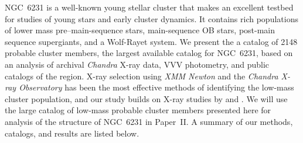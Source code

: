 \documentclass[twocolumn,tighten]{aastex61}
\begin{document}
NGC~6231 is a well-known young stellar cluster that makes an excellent testbed for studies of young stars and early cluster dynamics. It contains rich populations of lower mass pre--main-sequence stars, main-sequence OB stars, post-main sequence supergiants, and a Wolf-Rayet system.  We present the a catalog of 2148 probable cluster members, the largest available catalog for NGC~6231, based on an analysis of archival {\it Chandra} X-ray data, VVV photometry, and public catalogs of the region. X-ray selection using {\it XMM Newton}  and the {\it Chandra X-ray Observatory} has been the most effective methods of identifying the low-mass cluster population, and our study builds on X-ray studies by \citet{2004MNRAS.350..809S,2005A&A...441..213S,2006MNRAS.371...67S,2006A&A...454.1047S,2006MNRAS.372..661S,2007ApJ...659.1582S,2007MNRAS.377..945S,2008MNRAS.386..447S,2008NewA...13..202S} and . We will use the large catalog of low-mass probable cluster members presented here for analysis of the structure of NGC~6231 in Paper~II. A summary of our methods, catalogs, and results are listed below. 
\end{document}
